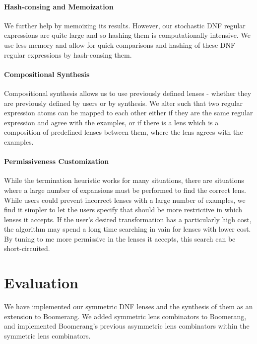 \documentclass[acmsmall,screen,anonymous]{acmart}
\begin{document}
\paragraph*{Hash-consing and Memoization} We further help \GreedySynth by
memoizing its results.  However, our stochastic DNF regular expressions are
quite large and so hashing them is computationally intensive.  We use less
memory and allow for quick comparisons and hashing of these DNF regular
expressions by hash-consing them.

\paragraph*{Compositional Synthesis} Compositional synthesis allows us to use
previously defined lenses - whether they are previously defined by users or by
synthesis. We alter \GreedySynth such that two regular expression atoms can be
mapped to each other either if they are the same regular expression and agree
with the examples, or if there is a lens which is a composition of predefined
lenses between them, where the lens agrees with the examples.

\paragraph*{\RXSearch Permissiveness Customization}
While the termination heuristic works for many situations, there are situations
where a large number of expansions must be performed to find the correct lens.
While users could prevent incorrect lenses with a large number of examples, we
find it simpler to let the users specify that \RXSearch should be more
restrictive in which lenses it accepts. If the user's desired transformation has
a particularly high cost, the algorithm may spend a long time searching in vain
for lenses with lower cost.  By tuning \RXSearch to me more permissive in the
lenses it accepts, this search can be short-circuited.

\section{Evaluation}
\label{sec:evaluation}
We have implemented our symmetric DNF lenses and the synthesis of them as an
extension to Boomerang. We added symmetric lens combinators to Boomerang, and
implemented Boomerang's previous asymmetric lens combinators within the
symmetric lens combinators.
\end{document}
